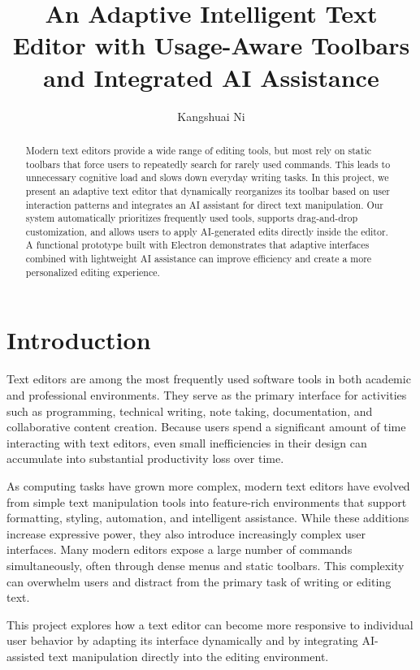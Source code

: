 \documentclass[sigconf]{acmart}
\title{An Adaptive Intelligent Text Editor with Usage-Aware Toolbars and Integrated AI Assistance}
\author{Kangshuai Ni}
\affiliation{%
\institution{Stony Brook University}
\department{Department of Computer Science}
}
\begin{document}
\begin{abstract}
Modern text editors provide a wide range of editing tools, but most rely on static toolbars that force users to repeatedly search for rarely used commands. This leads to unnecessary cognitive load and slows down everyday writing tasks. In this project, we present an adaptive text editor that dynamically reorganizes its toolbar based on user interaction patterns and integrates an AI assistant for direct text manipulation. Our system automatically prioritizes frequently used tools, supports drag-and-drop customization, and allows users to apply AI-generated edits directly inside the editor. A functional prototype built with Electron demonstrates that adaptive interfaces combined with lightweight AI assistance can improve efficiency and create a more personalized editing experience.
\end{abstract}


\maketitle

\section{Introduction}

Text editors are among the most frequently used software tools in both academic and professional environments. They serve as the primary interface for activities such as programming, technical writing, note taking, documentation, and collaborative content creation. Because users spend a significant amount of time interacting with text editors, even small inefficiencies in their design can accumulate into substantial productivity loss over time.

As computing tasks have grown more complex, modern text editors have evolved from simple text manipulation tools into feature-rich environments that support formatting, styling, automation, and intelligent assistance. While these additions increase expressive power, they also introduce increasingly complex user interfaces. Many modern editors expose a large number of commands simultaneously, often through dense menus and static toolbars. This complexity can overwhelm users and distract from the primary task of writing or editing text.

This project explores how a text editor can become more responsive to individual user behavior by adapting its interface dynamically and by integrating AI-assisted text manipulation directly into the editing environment.
\end{document}
